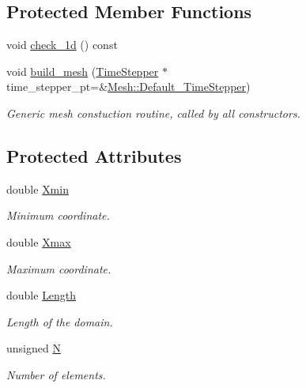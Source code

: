 \subsection*{Protected Member Functions}
\begin{DoxyCompactItemize}
\item 
void \hyperlink{classoomph_1_1OneDMesh_a780eb2a0fdf02690aa5e93efe5ff3848}{check\+\_\+1d} () const
\item 
void \hyperlink{classoomph_1_1OneDMesh_a5a1a27eaa9d58bb85facb617127e9f0a}{build\+\_\+mesh} (\hyperlink{classoomph_1_1TimeStepper}{Time\+Stepper} $\ast$time\+\_\+stepper\+\_\+pt=\&\hyperlink{classoomph_1_1Mesh_a12243d0fee2b1fcee729ee5a4777ea10}{Mesh\+::\+Default\+\_\+\+Time\+Stepper})
\begin{DoxyCompactList}\small\item\em Generic mesh constuction routine, called by all constructors. \end{DoxyCompactList}\end{DoxyCompactItemize}
\subsection*{Protected Attributes}
\begin{DoxyCompactItemize}
\item 
double \hyperlink{classoomph_1_1OneDMesh_ab1c25c2437f203dd1f6d42ec0613e6a1}{Xmin}
\begin{DoxyCompactList}\small\item\em Minimum coordinate. \end{DoxyCompactList}\item 
double \hyperlink{classoomph_1_1OneDMesh_ac625d93f5299895ad5801918a20aea31}{Xmax}
\begin{DoxyCompactList}\small\item\em Maximum coordinate. \end{DoxyCompactList}\item 
double \hyperlink{classoomph_1_1OneDMesh_a9c5ebabd7b2286b5f489563b1106e1b4}{Length}
\begin{DoxyCompactList}\small\item\em Length of the domain. \end{DoxyCompactList}\item 
unsigned \hyperlink{classoomph_1_1OneDMesh_a6f6f4087d7dd7417c79f39f2c3a2865a}{N}
\begin{DoxyCompactList}\small\item\em Number of elements. \end{DoxyCompactList}\end{DoxyCompactItemize}
